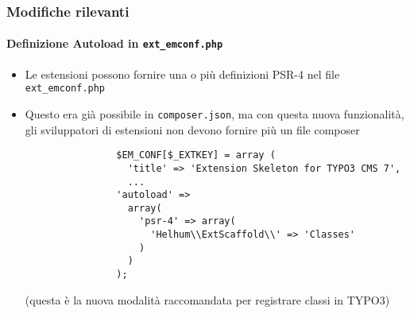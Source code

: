 \begin{frame}[fragile]
	\frametitle{Modifiche rilevanti}
	\framesubtitle{Definizione Autoload in \texttt{ext\_emconf.php}}

	\lstset{basicstyle=\tiny\ttfamily}

	\begin{itemize}

		\item Le estensioni possono fornire una o più definizioni PSR-4 nel file \texttt{ext\_emconf.php} 

		\item Questo era già possibile in \texttt{composer.json}, ma con questa nuova funzionalità,
			gli sviluppatori di estensioni non devono fornire più un file composer

			\begin{lstlisting}
				$EM_CONF[$_EXTKEY] = array (
				  'title' => 'Extension Skeleton for TYPO3 CMS 7',
				  ...
				'autoload' =>
				  array(
				    'psr-4' => array(
				      'Helhum\\ExtScaffold\\' => 'Classes'
				    )
				  )
				);
			\end{lstlisting}

			\small
				(questa è la nuova modalità raccomandata per registrare classi in TYPO3)
			\normalsize

	\end{itemize}

\end{frame}


